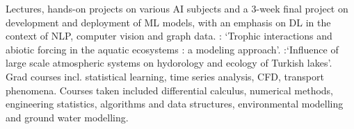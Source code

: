 \documentclass[
	a4paper,
]{fortysecondscv}
\begin{document}
\begin{cvtable}[1.0]
\end{cvtable}

\begin{cvtable}[1.0]
		{Lectures, hands-on projects on various AI subjects and a 3-week final project on development and deployment of ML models, with an emphasis on DL in the context of NLP, computer vision and graph data.}
		{\href{https://kops.uni-konstanz.de/handle/123456789/16454}{\color{pblue}{Thesis}}: `Trophic interactions and abiotic forcing in the aquatic ecosystems : a modeling approach'.}
		{\href{https://open.metu.edu.tr/handle/11511/17512}{\color{pblue}{Thesis}}:`Influence of large scale atmospheric systems on hydorology and ecology of Turkish lakes'. Grad courses incl. statistical learning, time series analysis, CFD, transport phenomena.}
		{Courses taken included differential calculus, numerical methods, engineering statistics, algorithms and data structures, environmental modelling and ground water modelling.}
\end{cvtable}
\end{document}

